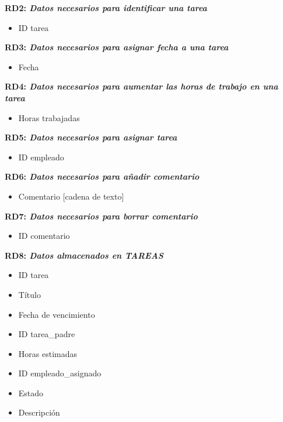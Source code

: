 \documentclass[paper=a4, fontsize=11pt, spanish]{scrartcl}
\begin{document}
\setlength{\parindent}{0em}
\textbf{RD2: \textit{Datos necesarios para identificar una tarea}}
\setlength{\parindent}{2em}
\begin{itemize}
\item ID tarea
\end{itemize}

\setlength{\parindent}{0em}
\textbf{RD3: \textit{Datos necesarios para asignar fecha a una tarea}}
\setlength{\parindent}{2em}
\begin{itemize}
\item Fecha
\end{itemize}

\setlength{\parindent}{0em}
\textbf{RD4: \textit{Datos necesarios para aumentar las horas de trabajo en una tarea}}
\setlength{\parindent}{2em}
\begin{itemize}
\item Horas trabajadas
\end{itemize}

\setlength{\parindent}{0em}
\textbf{RD5: \textit{Datos necesarios para asignar tarea}}
\setlength{\parindent}{2em}
\begin{itemize}
\item ID empleado
\end{itemize}

\setlength{\parindent}{0em}
\textbf{RD6: \textit{Datos necesarios para añadir comentario}}
\setlength{\parindent}{2em}
\begin{itemize}
\item Comentario [cadena de texto]
\end{itemize}

\setlength{\parindent}{0em}
\textbf{RD7: \textit{Datos necesarios para borrar comentario}}
\setlength{\parindent}{2em}
\begin{itemize}
\item ID comentario
\end{itemize}

\setlength{\parindent}{0em}
\textbf{RD8: \textit{Datos almacenados en TAREAS}}
\setlength{\parindent}{2em}
\begin{itemize}
\item ID tarea
\item Título
\item Fecha de vencimiento
\item ID tarea\_padre
\item Horas estimadas
\item ID empleado\_asignado
\item Estado
\item Descripción
\end{itemize}
\end{document}

